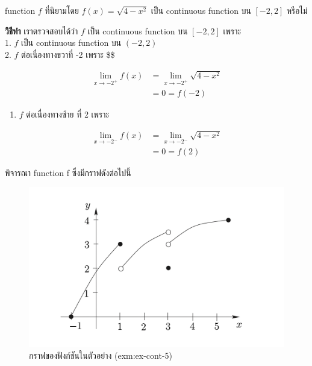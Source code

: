 \documentclass[
]{book}
\providecommand{\tightlist}{%
  \setlength{\itemsep}{0pt}\setlength{\parskip}{0pt}}
\begin{document}
\label{ex-cont-4}
function \(f\) ที่นิยามโดย \(f\left( x\right) =\sqrt{4-x^{2}}\) เป็น
continuous function บน \(\left[ -2,2\right]\) หรือไม่

\textbf{วิธีทำ} เราตรวจสอบได้ว่า \(f\) เป็น continuous function บน
\(\left[ -2,2\right]\) เพราะ\\
1. \(f\) เป็น continuous function บน \(\left( -2,2\right)\)\\
2. \(f\) ต่อเนื่องทางขวาที่ -2 เพราะ \$\$

\begin{equation}
  \begin{aligned}
    \underset{x\rightarrow -2^{+}}{\lim}f(x)
        &=\underset{x\rightarrow -2^{+}}{\lim}\sqrt{4-x^{2}} \\
        &=0=f\left( -2\right)
  \end{aligned}
\end{equation}

\begin{enumerate}
\def\labelenumi{\arabic{enumi}.}
\setcounter{enumi}{2}
\tightlist
\item
  \(f\) ต่อเนื่องทางซ้าย ที่ 2 เพราะ
\end{enumerate}

\begin{equation}
  \begin{aligned}
        \underset{x\rightarrow -2^{-}}{\lim}f(x)
        &=\underset{x\rightarrow -2^{-}}{\lim}\sqrt{4-x^{2}} \\
        &=0 =f\left( 2\right)
  \end{aligned}
\end{equation}

\label{ex-cont-5}
พิจารณา function f ซึ่งมีกราฟดังต่อไปนี้

\begin{figure}

{\centering \includegraphics[width=0.5\linewidth]{images/fig-continuity-2} 

}

\caption{กราฟของฟังก์ชันในตัวอย่าง \@ref(exm:ex-cont-5)}\label{fig:fig-continuity-2}
\end{figure}
\end{document}
